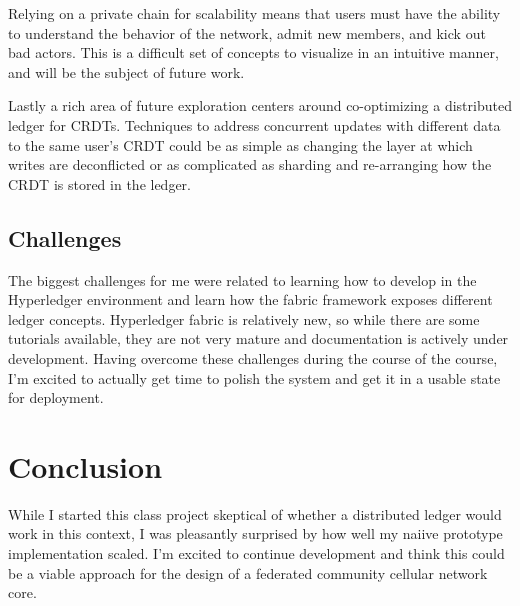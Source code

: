 Relying on a private chain for scalability means that users must have
the ability to understand the behavior of the network, admit new
members, and kick out bad actors. This is a difficult set of concepts
to visualize in an intuitive manner, and will be the subject of future
work.

Lastly a rich area of future exploration centers around co-optimizing
a distributed ledger for CRDTs. Techniques to address concurrent
updates with different data to the same user's CRDT could be as simple
as changing the layer at which writes are deconflicted or as
complicated as sharding and re-arranging how the CRDT is stored in the
ledger.

\subsection{Challenges}

The biggest challenges for me were related to learning how to develop
in the Hyperledger environment and learn how the fabric framework
exposes different ledger concepts. Hyperledger fabric is relatively
new, so while there are some tutorials available, they are not very
mature and documentation is actively under development. Having
overcome these challenges during the course of the course, I'm excited
to actually get time to polish the system and get it in a usable state
for deployment.

\section{Conclusion}

While I started this class project skeptical of whether a distributed
ledger would work in this context, I was pleasantly surprised by how
well my naiive prototype implementation scaled. I'm excited to
continue development and think this could be a viable approach for the
design of a federated community cellular network core.

